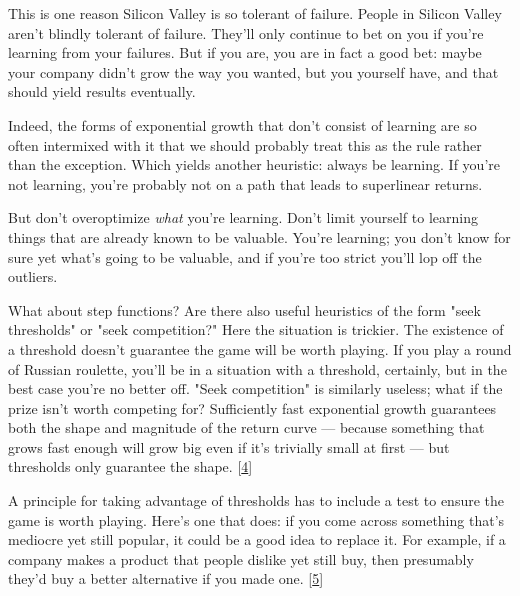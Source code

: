 This is one reason Silicon Valley is
                  so tolerant of failure. People in Silicon Valley aren't
                  blindly tolerant of failure. They'll only continue to bet on
                  you if you're learning from your failures. But if you are, you
                  are in fact a good bet: maybe your company didn't grow the way
                  you wanted, but you yourself have, and that should yield
                  results eventually.

Indeed, the forms of
                  exponential growth that don't consist of learning are so often
                  intermixed with it that we should probably treat this as the
                  rule rather than the exception. Which yields another
                  heuristic: always be learning. If you're not learning, you're
                  probably not on a path that leads to superlinear returns.

But
                  don't overoptimize \emph{what} you're learning. Don't limit
                  yourself to learning things that are already known to be
                  valuable. You're learning; you don't know for sure yet what's
                  going to be valuable, and if you're too strict you'll lop off
                  the outliers.

What about step functions? Are there
                  also useful heuristics of the form "seek thresholds" or "seek
                  competition?" Here the situation is trickier. The existence of
                  a threshold doesn't guarantee the game will be worth playing.
                  If you play a round of Russian roulette, you'll be in a
                  situation with a threshold, certainly, but in the best case
                  you're no better off. "Seek competition" is similarly useless;
                  what if the prize isn't worth competing for? Sufficiently fast
                  exponential growth guarantees both the shape and magnitude of
                  the return curve --- because something that grows fast
                  enough will grow big even if it's trivially small at first
                  --- but thresholds only guarantee the shape.
                  [\href{\#f4n}{4}]

A principle for taking advantage of thresholds
                  has to include a test to ensure the game is worth playing.
                  Here's one that does: if you come across something that's
                  mediocre yet still popular, it could be a good idea to replace
                  it. For example, if a company makes a product that people
                  dislike yet still buy, then presumably they'd buy a better
                  alternative if you made one.
                  [\href{\#f5n}{5}]

